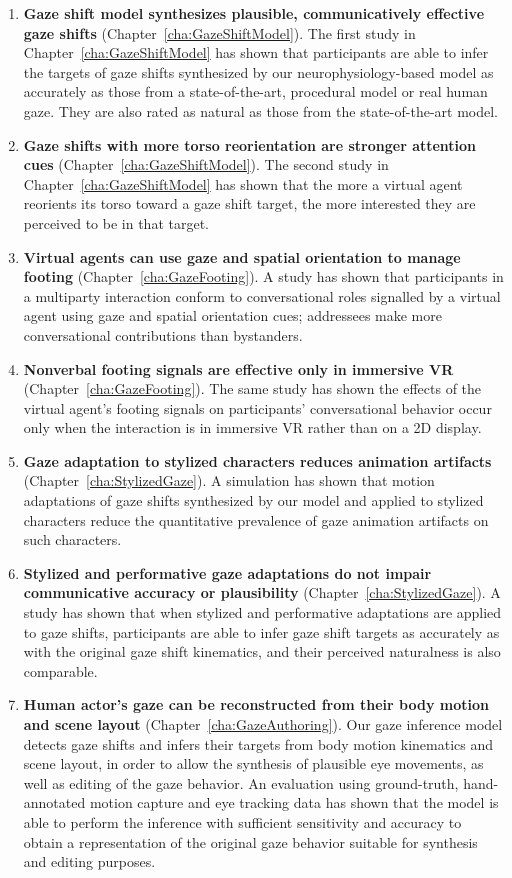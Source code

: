 \begin{enumerate}
\item \textbf{Gaze shift model synthesizes plausible, communicatively effective gaze shifts} (Chapter~\ref{cha:GazeShiftModel}). The first study in Chapter~\ref{cha:GazeShiftModel} has shown that participants are able to infer the targets of gaze shifts synthesized by our neurophysiology-based model as accurately as those from a state-of-the-art, procedural model or real human gaze. They are also rated as natural as those from the state-of-the-art model.
\item \textbf{Gaze shifts with more torso reorientation are stronger attention cues} (Chapter~\ref{cha:GazeShiftModel}). The second study in Chapter~\ref{cha:GazeShiftModel} has shown that the more a virtual agent reorients its torso toward a gaze shift target, the more interested they are perceived to be in that target.
\item \textbf{Virtual agents can use gaze and spatial orientation to manage footing} (Chapter~\ref{cha:GazeFooting}). A study has shown that participants in a multiparty interaction conform to conversational roles signalled by a virtual agent using gaze and spatial orientation cues; addressees make more conversational contributions than bystanders.
\item \textbf{Nonverbal footing signals are effective only in immersive VR} (Chapter~\ref{cha:GazeFooting}). The same study has shown the effects of the virtual agent's footing signals on participants' conversational behavior occur only when the interaction is in immersive VR rather than on a 2D display.
\item \textbf{Gaze adaptation to stylized characters reduces animation artifacts} (Chapter~\ref{cha:StylizedGaze}). A simulation has shown that motion adaptations of gaze shifts synthesized by our model and applied to stylized characters reduce the quantitative prevalence of gaze animation artifacts on such characters.
\item \textbf{Stylized and performative gaze adaptations do not impair communicative accuracy or plausibility} (Chapter~\ref{cha:StylizedGaze}). A study has shown that when stylized and performative adaptations are applied to gaze shifts, participants are able to infer gaze shift targets as accurately as with the original gaze shift kinematics, and their perceived naturalness is also comparable.
\item \textbf{Human actor's gaze can be reconstructed from their body motion and scene layout} (Chapter~\ref{cha:GazeAuthoring}). Our gaze inference model detects gaze shifts and infers their targets from body motion kinematics and scene layout, in order to allow the synthesis of plausible eye movements, as well as editing of the gaze behavior. An evaluation using ground-truth, hand-annotated motion capture and eye tracking data has shown that the model is able to perform the inference with sufficient sensitivity and accuracy to obtain a representation of the original gaze behavior suitable for synthesis and editing purposes.

\end{enumerate}
